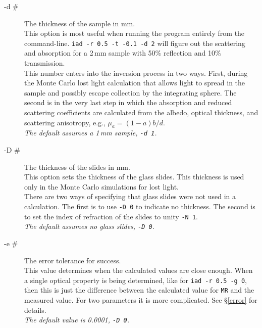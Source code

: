 \documentclass{article}
\begin{document}
\begin{description}
    \item[-d \#] The thickness of the sample in mm.\\[1mm]
                 This option is most useful when running the program entirely from the command-line.  \texttt{iad -r 0.5 -t -0.1 -d 2}
                 will figure out the scattering and absorption for a 2\,mm sample with 50\% reflection and 10\%
                 transmission.\\[1mm]
                 This number enters into the inversion process in two ways.  First, during the Monte Carlo lost light 
                 calculation that allows light to spread in the sample and possibly escape collection by the 
                 integrating sphere.  The second is in the very last step in which the absorption and reduced 
                 scattering coefficients are calculated from the albedo, optical
                 thickness, and scattering anisotropy, e.g., $\mu_a=(1-a)b/d$.\\[1mm]
                 \textit{The default assumes a 1\,mm sample, \texttt{-d 1}.}
               
    \item[-D \#] The thickness of the slides in mm.\\[1mm]
                 This option sets the thickness of the glass slides.  This thickness is used
                 only in the Monte Carlo simulations for lost light.\\[1mm]
                 There are two ways of specifying that glass slides were not used in a calculation.  The first is
                 to use \texttt{-D 0} to indicate no thickness.  The second is to set the index
                 of refraction of the slides to unity \texttt{-N 1}.\\[1mm]
                 \textit{The default assumes no glass slides, \texttt{-D 0}.}

    \item[-e \#] The error tolerance for success.\\[1mm]
                 This value determines when the calculated values are close enough. When a single optical
                 property is being determined, like for \texttt{iad -r 0.5 -g 0}, then this is just the
                 difference between the calculated value for \texttt{MR} and the measured value.  For two
                 parameters it is more complicated.  See \S \ref{error} for details.\\[1mm]
                 \textit{The default value is 0.0001, \texttt{-D 0}.}
                 

\end{description}
\end{document}
